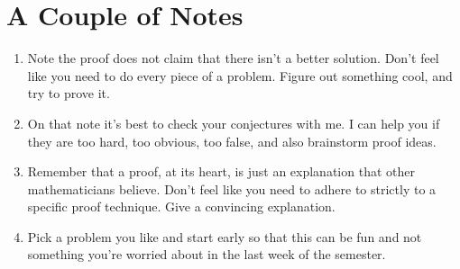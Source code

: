 \documentclass{article}  %
\begin{document}
\newpage

\section*{A Couple of Notes}

\begin{enumerate}
\item Note the proof does not claim that there isn't a better solution. Don't feel like you need to do every piece of a problem. Figure out something cool, and try to prove it.
\item On that note it's best to check your conjectures with me. I can help you if they are too hard, too obvious, too false, and also brainstorm proof ideas.
\item Remember that  a proof, at its heart, is just an explanation that other mathematicians believe. Don't feel like you need to adhere to strictly to a specific proof technique. Give a convincing explanation.
\item Pick a problem you like and start early so that this can be fun and not something you're worried about in the last week of the semester.
\end{enumerate}
\end{document}
